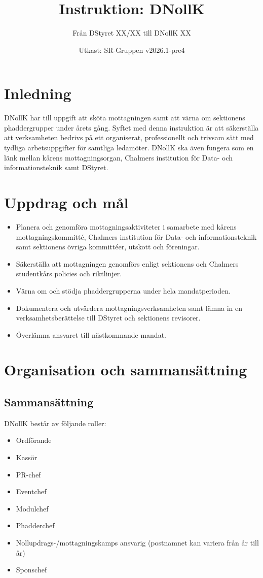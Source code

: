 \documentclass[a4paper]{dtekinstruktion}
\title{Instruktion: DNollK}
\subtitle{Från DStyret XX/XX till DNollK XX}
\date{Utkast: SR-Gruppen v2026.1-pre4}
\begin{document}
\makeheadfoot

\tableofcontents

\section{Inledning}
DNollK har till uppgift att sköta mottagningen samt att värna om sektionens phaddergrupper under årets gång. Syftet med denna instruktion är att säkerställa att verksamheten bedrivs på ett organiserat, professionellt och trivsam sätt med tydliga arbetsuppgifter för samtliga ledamöter. DNollK ska även fungera som en länk mellan kårens mottagningsorgan, Chalmers institution för Data- och informationsteknik samt DStyret.

\section{Uppdrag och mål}
\begin{itemize}
  \item Planera och genomföra mottagningsaktiviteter i samarbete med kårens mottagningskommitté, Chalmers institution för Data- och informationsteknik samt sektionens övriga kommittéer, utskott och föreningar.
  \item Säkerställa att mottagningen genomförs enligt sektionens och Chalmers studentkårs policies och riktlinjer.
  \item Värna om och stödja phaddergrupperna under hela mandatperioden.
  \item Dokumentera och utvärdera mottagningsverksamheten samt lämna in en verksamhetsberättelse till DStyret och sektionens revisorer.
  \item Överlämna ansvaret till nästkommande mandat.
\end{itemize}

\section{Organisation och sammansättning}
\subsection{Sammansättning}
DNollK består av följande roller:
\begin{itemize}
  \item Ordförande
  \item Kassör
  \item PR-chef
  \item Eventchef
  \item Modulchef
  \item Phadderchef
  \item Nollupdrags-/mottagningskamps ansvarig (postnamnet kan variera från år till år)
  \item Sponschef
\end{itemize}
\end{document}
